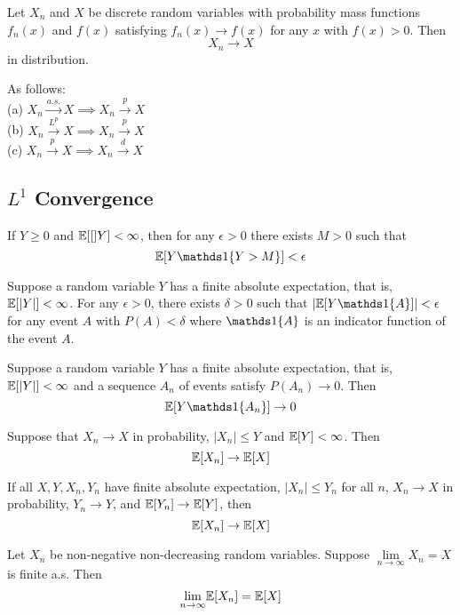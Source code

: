 \documentclass[11pt]{article}
\begin{document}
\theorem
Let $X_n$ and $X$ be discrete random variables with probability mass functions $f_n(x)$ and $f(x)$ satisfying $f_n(x) \rightarrow f(x)$ for any $x$ with $f(x) > 0$. Then $$X_n \longrightarrow X$$ in distribution.

 As follows:\\
(a) $X_n \overset{a.s.}{\longrightarrow} X \implies X_n \overset{p}{\longrightarrow} X$ \\
(b) $X_n \overset{L^p}{\longrightarrow} X \implies X_n \overset{p}{\longrightarrow} X$ \\
(c) $X_n \overset{p}{\longrightarrow} X \implies X_n \overset{d}{\longrightarrow} X$ \\

\subsection{$L^1$ Convergence}
\lemma[$L^1$ Convergence]
If $Y \geq 0$ and $\mathbb{E}[{[}]Y] < \infty$, then for any $\epsilon > 0$ there exists $M > 0$ such that $$\expect{Y\id{Y > M}} < \epsilon$$

\lemma
Suppose a random variable $Y$ has a finite absolute expectation, that is, $\mathbb{E}[{|Y|}] < \infty$. For any $\epsilon > 0$, there exists $\delta > 0$ such that $|\expect{Y\id{A}}| < \epsilon$ for any event $A$ with $P(A) < \delta$ where $\id{A}$ is an indicator function of the event $A$. 

\lemma
Suppose a random variable $Y$ has a finite absolute expectation, that is, $\mathbb{E}[{|Y|}] < \infty$ and a sequence $A_n$ of events satisfy $P(A_n) \rightarrow 0$. Then $$\expect{Y\id{A_n}} \rightarrow 0$$

Suppose that $X_n \rightarrow X$ in probability, $|X_n| \leq Y$ and $\mathbb{E}[{Y}] < \infty$. Then
$$\mathbb{E}[{X_n}] \rightarrow \mathbb{E}[{X}]$$

If all $X, Y, X_n, Y_n$ have finite absolute expectation, $|X_n| \leq Y_n$ for all $n$, $X_n \rightarrow X$ in probability, $Y_n \rightarrow Y$, and $\mathbb{E}[{Y_n}] \rightarrow \mathbb{E}[{Y}]$, then $$\mathbb{E}[{X_n}] \rightarrow \mathbb{E}[{X}]$$

Let $X_n$ be non-negative non-decreasing random variables. Suppose $\underset{n \rightarrow \infty}{\lim} X_n = X$ is finite a.s. Then $$\underset{n \rightarrow \infty}{\lim} \mathbb{E}[{X_n}] = \mathbb{E}[{X}]$$ 
 
\end{document}
